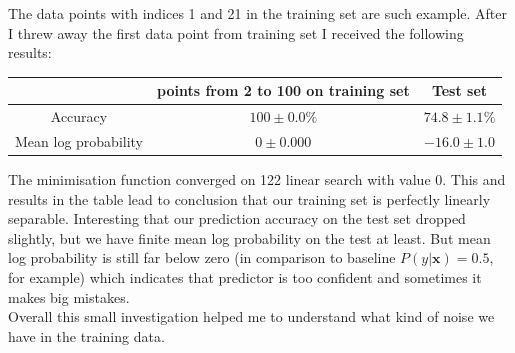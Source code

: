 \documentclass{article}
\newcommand{\vect}[1]{\boldsymbol{#1}} %
\begin{document}
\begin{enumerate}[label=(\alph*)]
						
						The data points with indices 1 and 21 in the training set are such example. After I threw away the first data point from training set I received the following results:
						\begin{center}
							\begin{tabular}{| c | c | c |}
								\hline
								\, & points from 2 to 100 on training set & Test set \\ 
								\hline
								Accuracy                  & $100 \pm 0.0 \% $ & $ 74.8 \pm 1.1  \%$ \\ 
								\hline
								Mean log probability &$ 0 \pm 0.000$ &  $ -16.0 \pm 1.0 $ \\
								\hline
							\end{tabular}
						\end{center}
						The minimisation function converged on 122 linear search with value 0. This and results in the table lead to conclusion that our training set is perfectly linearly separable. Interesting that our prediction accuracy on the test set dropped slightly, but we have  finite mean log probability on the test at least. But mean log probability is still far below zero (in comparison to baseline $P(y | \vect{x})=0.5$, for example) which indicates that predictor is too confident and sometimes it makes big mistakes. 
						\\
						Overall this small investigation helped me to understand what kind of noise we have in the training data. 
				\end{enumerate}
\end{document}
